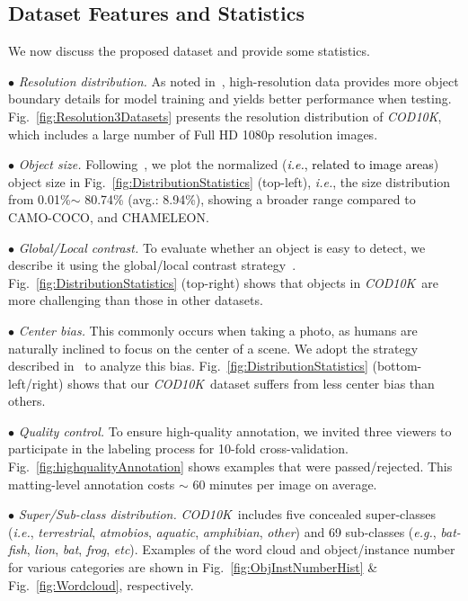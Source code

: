\documentclass[10pt,journal,compsoc]{IEEEtran}
\def\ie{\emph{i.e.}}
\def\eg{\emph{e.g.}}
\def\etc{\emph{etc}}
\newcommand{\figref}[1]{Fig.~\ref{#1}}
\newcommand{\Rev}[1]{\textcolor{black}{#1}}
\def\ourdataset{\textit{COD10K}}
\begin{document}
\subsection{Dataset Features and Statistics}\label{sec:datasetFeatures}
We now discuss the proposed dataset and provide some statistics. 

$\bullet$ \emph{Resolution distribution.}
As noted in~\cite{zeng2019towards}, high-resolution data
provides more object boundary details for model training and
yields better performance when testing.
\figref{fig:Resolution3Datasets} presents the resolution distribution of 
\ourdataset, which includes a large number of Full HD 1080p resolution images.

$\bullet$ \emph{Object size.}
Following~\cite{Fan2021SOC}, we plot the normalized (\Rev{\ie, related to image areas}) object size in
\figref{fig:DistributionStatistics} (top-left), \ie, the size distribution from
0.01\%$\sim$ 80.74\% (avg.: 8.94\%), showing a broader range compared to
CAMO-COCO, and CHAMELEON.

$\bullet$ \emph{Global/Local contrast.}
To evaluate whether an object is easy to detect,
we describe it using the global/local contrast strategy~\cite{li2014secrets}.
%
\figref{fig:DistributionStatistics} (top-right) shows that objects
in \ourdataset~are more challenging than those in other datasets.

$\bullet$ \emph{Center bias.}
This commonly occurs when taking a photo, as
humans are naturally inclined to focus on the center of a scene.
We adopt the strategy described in~\cite{Fan2021SOC} to analyze this bias.
\figref{fig:DistributionStatistics} (bottom-left/right) shows that our 
\ourdataset~dataset suffers from less center bias than others.


$\bullet$ \emph{Quality control.}
To ensure high-quality annotation, we invited three viewers to participate in
the labeling process for 10-fold cross-validation.
\figref{fig:highqualityAnnotation} shows examples that were passed/rejected.
This matting-level annotation costs $\sim$ 60 minutes per image on average.

$\bullet$ \emph{Super/Sub-class distribution.}
\ourdataset~includes five concealed super-classes (\ie, \emph{terrestrial}, 
\emph{atmobios}, \emph{aquatic}, \emph{amphibian}, \emph{other}) and
69 sub-classes (\eg, \emph{bat-fish}, \emph{lion}, \emph{bat}, \emph{frog}, 
\etc). 
Examples of the word cloud and object/instance number for various categories are
shown in \figref{fig:ObjInstNumberHist} \& \figref{fig:Wordcloud}, respectively.
\end{document}
